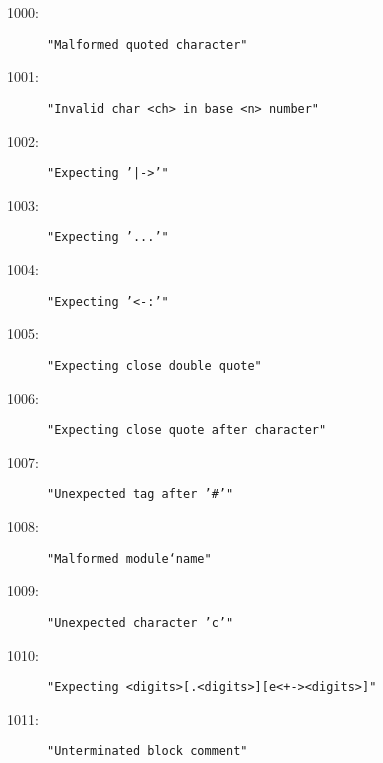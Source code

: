 %
%
%

\begin{description}
\item[1000:] \texttt{"Malformed quoted character"}
\item[1001:] \texttt{"Invalid char <ch> in base <n> number"}
\item[1002:] \texttt{"Expecting '|->'"}
\item[1003:] \texttt{"Expecting '...'"}
\item[1004:] \texttt{"Expecting '<-:'"}
\item[1005:] \texttt{"Expecting close double quote"}
\item[1006:] \texttt{"Expecting close quote after character"}
\item[1007:] \texttt{"Unexpected tag after '\#'"}
\item[1008:] \texttt{"Malformed module`name"}
\item[1009:] \texttt{"Unexpected character 'c'"}
\item[1010:] \texttt{"Expecting <digits>[.<digits>][e<+-><digits>]"}
\item[1011:] \texttt{"Unterminated block comment"}
\end{description}
